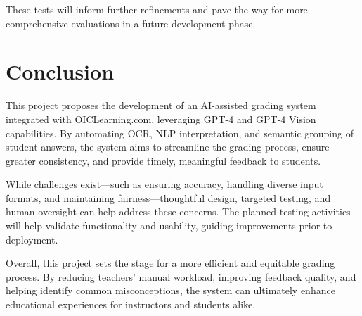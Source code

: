 \documentclass[ms,twoside,print]{nuthesis}
\begin{document}
These tests will inform further refinements and pave the way for more comprehensive evaluations in a future development phase.

\chapter{Conclusion}

This project proposes the development of an AI-assisted grading system integrated with OICLearning.com, leveraging GPT-4 and GPT-4 Vision capabilities. By automating OCR, NLP interpretation, and semantic grouping of student answers, the system aims to streamline the grading process, ensure greater consistency, and provide timely, meaningful feedback to students.

While challenges exist—such as ensuring accuracy, handling diverse input formats, and maintaining fairness—thoughtful design, targeted testing, and human oversight can help address these concerns. The planned testing activities will help validate functionality and usability, guiding improvements prior to deployment.

Overall, this project sets the stage for a more efficient and equitable grading process. By reducing teachers’ manual workload, improving feedback quality, and helping identify common misconceptions, the system can ultimately enhance educational experiences for instructors and students alike.



\end{document}
